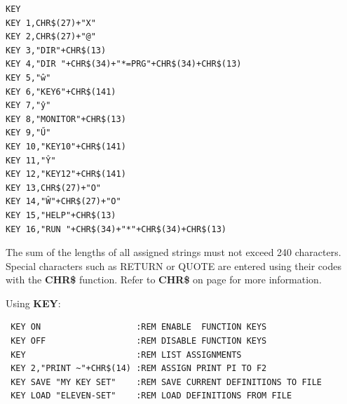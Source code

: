 \begin{description}[leftmargin=2cm,style=nextline]
\begin{tcolorbox}[colback=black,coltext=white]
\verbatimfont{\codefont}
\begin{verbatim}
KEY
KEY 1,CHR$(27)+"X"
KEY 2,CHR$(27)+"@"
KEY 3,"DIR"+CHR$(13)
KEY 4,"DIR "+CHR$(34)+"*=PRG"+CHR$(34)+CHR$(13)
KEY 5,"ŵ"
KEY 6,"KEY6"+CHR$(141)
KEY 7,"ŷ"
KEY 8,"MONITOR"+CHR$(13)
KEY 9,"Ű"
KEY 10,"KEY10"+CHR$(141)
KEY 11,"Ŷ"
KEY 12,"KEY12"+CHR$(141)
KEY 13,CHR$(27)+"O"
KEY 14,"Ŵ"+CHR$(27)+"O"
KEY 15,"HELP"+CHR$(13)
KEY 16,"RUN "+CHR$(34)+"*"+CHR$(34)+CHR$(13)
\end{verbatim}
\end{tcolorbox}

\item [Remarks:] The sum of the lengths of all assigned strings
                 must not exceed 240 characters.
                 Special characters such as RETURN or QUOTE are entered
                 using their codes with the {\bf CHR\$} function.
                 Refer to {\bf CHR\$} on page \pageref{BASIC 65 Functions!CHR}
                 for more information.

\item [Examples:] Using {\bf KEY}:
\begin{tcolorbox}[colback=black,coltext=white]
\verbatimfont{\codefont}
\begin{verbatim}
 KEY ON                   :REM ENABLE  FUNCTION KEYS
 KEY OFF                  :REM DISABLE FUNCTION KEYS
 KEY                      :REM LIST ASSIGNMENTS
 KEY 2,"PRINT ~"+CHR$(14) :REM ASSIGN PRINT PI TO F2
 KEY SAVE "MY KEY SET"    :REM SAVE CURRENT DEFINITIONS TO FILE
 KEY LOAD "ELEVEN-SET"    :REM LOAD DEFINITIONS FROM FILE
\end{verbatim}
\end{tcolorbox}
\end{description}


\newpage
